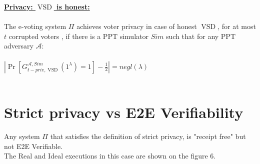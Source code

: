 \documentclass[12pt]{article}
\DeclareMathOperator{\vsd}{VSD}
\begin{document}
\underline{\textbf{Privacy: $\vsd$ is honest:}}\\\\
The e-voting system $\Pi$ achieves voter privacy in case of honest $\vsd$, for at most $t$ corrupted voters , if there is a PPT simulator $Sim$ such that for any PPT adversary $\mathcal{A}$:\\\\
 $|\Pr[G_{t-priv,\vsd}^{\mathcal{A},Sim}(1^{\lambda}) = 1] - \frac{1}{2}| = negl(\lambda)$\\\\
\section{Strict privacy vs E2E Verifiability}
Any system $\Pi$ that satisfies the definition of strict privacy, is "receipt free" but not E2E Verifiable.\\
The Real and Ideal executions in this case are shown on the figure 6.
\end{document}

